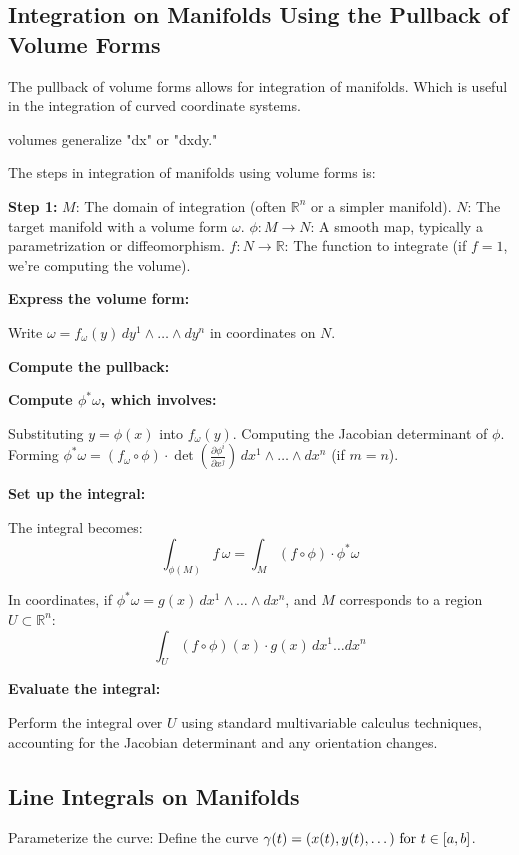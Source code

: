 \subsection{Integration on Manifolds Using the Pullback of Volume Forms}
The pullback of volume forms allows for integration of manifolds. Which is useful in the integration of curved coordinate systems.

volumes generalize "dx" or "dxdy."

The steps in integration of manifolds using volume forms is:

\textbf{Step 1:} $   M   $: The domain of integration (often $   \mathbb{R}^n   $ or a simpler manifold).
$   N   $: The target manifold with a volume form $   \omega   $.
$   \phi: M \to N   $: A smooth map, typically a parametrization or diffeomorphism.
$   f: N \to \mathbb{R}   $: The function to integrate (if $   f = 1   $, we’re computing the volume).


\textbf{Express the volume form:}

Write $   \omega = f_\omega(y) \, dy^1 \wedge \dots \wedge dy^n   $ in coordinates on $   N   $.


\textbf{Compute the pullback:}

\textbf{Compute $   \phi^* \omega   $, which involves:}

Substituting $   y = \phi(x)   $ into $   f_\omega(y)   $.
Computing the Jacobian determinant of $   \phi   $.
Forming $   \phi^* \omega = (f_\omega \circ \phi) \cdot \det \left( \frac{\partial \phi^i}{\partial x^j} \right) \, dx^1 \wedge \dots \wedge dx^n   $ (if $   m = n   $).




\textbf{Set up the integral:}

The integral becomes:
$$\int_{\phi(M)} f \, \omega = \int_M (f \circ \phi) \cdot \phi^* \omega$$

In coordinates, if $   \phi^* \omega = g(x) \, dx^1 \wedge \dots \wedge dx^n   $, and $   M   $ corresponds to a region $   U \subset \mathbb{R}^n   $:
$$\int_U (f \circ \phi)(x) \cdot g(x) \, dx^1 \dots dx^n$$



\textbf{Evaluate the integral:}

Perform the integral over $   U   $ using standard multivariable calculus techniques, accounting for the Jacobian determinant and any orientation changes.


\subsection{Line Integrals on Manifolds}
Parameterize the curve: Define the curve $\gamma (t)=(x(t),y(t),\dots )\) for \(t\in [a,b]$.

